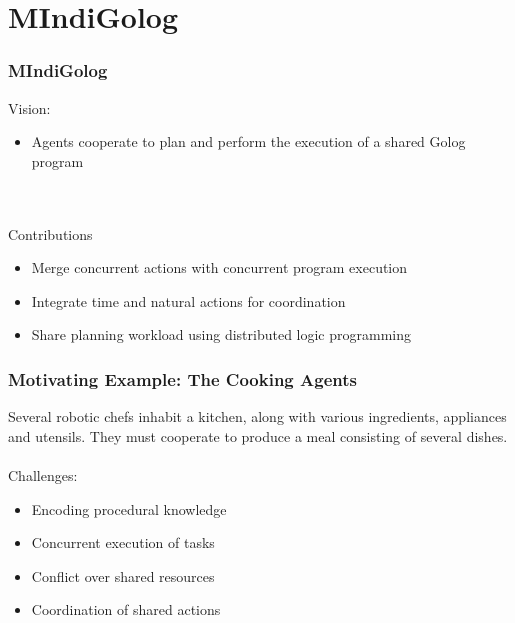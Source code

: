 \documentclass{beamer}
\begin{document}
\section{MIndiGolog}

\begin{frame}
\frametitle{MIndiGolog}
Vision:
\begin{itemize}
\item Agents cooperate to plan and perform the execution of a shared Golog program
\end{itemize}
\ \\
\ \\
Contributions
\begin{itemize}
\item Merge concurrent actions with concurrent program execution
\item Integrate time and natural actions for coordination
\item Share planning workload using distributed logic programming
\end{itemize}
\end{frame}

\begin{frame}
\frametitle{Motivating Example: The Cooking Agents}
Several robotic chefs inhabit a kitchen, along with various ingredients,
appliances and utensils.  They must cooperate to produce a meal consisting
of several dishes.\\
\ \\
\pause
Challenges:
\begin{itemize}
  \item Encoding procedural knowledge
  \item Concurrent execution of tasks
  \item Conflict over shared resources
  \item Coordination of shared actions
\end{itemize}
\end{frame}
\end{document}
